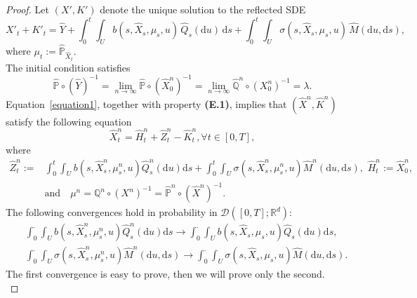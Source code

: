 \documentclass[11pt,amsfonts]{article}
\theoremstyle{plain}
\theoremstyle{assumpstyle}
\numberwithin{equation}{section}
\numberwithin{theorem}{section}
\numberwithin{proposition}{section}
\numberwithin{definition}{section}
\numberwithin{remark}{section}
\numberwithin{corollary}{section}
\numberwithin{lemma}{section}
\begin{document}
\begin{proof}
Let $(X', K')$ denote the unique solution to the reflected SDE
\begin{equation}\label{optimaleq2}
X'_t + K'_t= \hat{Y} 
+ \displaystyle\int_{0}^{t}\!\int_{U} b(s, \hat{X}_s, \mu_s, u)\,\hat{Q}_s(\mathrm{d}u)\,\mathrm{d}s 
+ \displaystyle\int_{0}^{t}\!\int_{U} \sigma(s, \hat{X}_{s}, \mu_{s}, u)\,\hat{M}(\mathrm{d}u,\mathrm{d}s) 
,
\end{equation}
where $\mu_t := \hat{\mathbb{P}}_{\hat{X}_t}$.\\
The initial condition satisfies
\begin{equation*}
\hat{\mathbb{P}} \circ (\hat{Y})^{-1} 
= \lim_{n \to \infty} \hat{\mathbb{P}} \circ (\hat{X}^n_0)^{-1} 
= \lim_{n \to \infty} \hat{\mathbb{Q}}^n \circ (X^n_0)^{-1} 
= \lambda.
\end{equation*}
Equation~\eqref{equation1}, together with property \textbf{(E.1)}, implies that $(\hat{X}^n, \hat{K}^n)$ satisfy the following equation
\begin{equation*}
\hat{X}^n_t = \hat{H}^n_t+ \hat{Z}^n_t-\hat{K}^n_t, \forall t \in [0, T],
\end{equation*}
where 
\begin{align*}
\hat{Z}^n_t := &\displaystyle\int_{0}^{t}\displaystyle\int_{U}^{} b(s,\hat{X}^n_s, \mu^n_s, u)\hat{Q}^n_s(\mathrm{d}u)\mathrm{d}s+\displaystyle\int_{0}^{t}\int_{U}^{}\sigma(s,\hat{X}^n_s, \mu^n_s, u) \hat{M}^n(\mathrm{d}u,\mathrm{d}s), \,\, \hat{H}^n_t :=\hat{X}^n_0, \\
&\text{and}\quad \mu^n= \mathbb{Q}^n\circ(X^n)^{-1} = \hat{\mathbb{P}}^n\circ(\hat{X}^n)^{-1}.
\end{align*}
The following convergences hold in probability in $\mathcal{D}([0, T]; \mathbb{R}^d)$:
\begin{equation}
\begin{split}
&\displaystyle\int_{0}^{\cdot}\displaystyle\int_{U}^{} b(s,\hat{X}^n_s, \mu^n_s, u)\hat{Q}^n_s(\mathrm{d}u)\mathrm{d}s \to \displaystyle\int_{0}^{\cdot}\displaystyle\int_{U}^{} b(s,\hat{X}_s, \mu_s, u)\hat{Q}_s(\mathrm{d}u)\mathrm{d}s, \\
&\displaystyle\int_{0}^{\cdot}\int_{U}^{}\sigma(s, \hat{X}^n_s, \mu^n_s, u) \hat{M}^n(\mathrm{d}u, \mathrm{d}s) \to \displaystyle\int_{0}^{\cdot}\int_{U}^{}\sigma(s,\hat{X}_{s}, \mu_{s}, u) \hat{M}(\mathrm{d}u,\mathrm{d}s). \label{con ofz}
\end{split}
\end{equation}
The first convergence is easy to prove, then we will prove only the second.\\

\end{proof}
\end{document}
